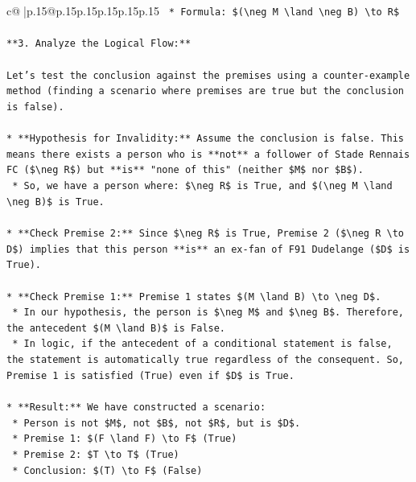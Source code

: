 \documentclass{article}
\begin{document}
{\begin{supertabular}{c@{$\;$}|p{.15\linewidth}@{}p{.15\linewidth}p{.15\linewidth}p{.15\linewidth}p{.15\linewidth}p{.15\linewidth}}
{{{\texttt{    *   Formula: \$(\textbackslash{}neg M \textbackslash{}land \textbackslash{}neg B) \textbackslash{}to R\$} \\
\\ 
\texttt{**3. Analyze the Logical Flow:**} \\
\\ 
\texttt{Let's test the conclusion against the premises using a counter{-}example method (finding a scenario where premises are true but the conclusion is false).} \\
\\ 
\texttt{*   **Hypothesis for Invalidity:** Assume the conclusion is false. This means there exists a person who is **not** a follower of Stade Rennais FC (\$\textbackslash{}neg R\$) but **is** "none of this" (neither \$M\$ nor \$B\$).} \\
\texttt{    *   So, we have a person where: \$\textbackslash{}neg R\$ is True, and \$(\textbackslash{}neg M \textbackslash{}land \textbackslash{}neg B)\$ is True.} \\
\\ 
\texttt{*   **Check Premise 2:** Since \$\textbackslash{}neg R\$ is True, Premise 2 (\$\textbackslash{}neg R \textbackslash{}to D\$) implies that this person **is** an ex{-}fan of F91 Dudelange (\$D\$ is True).} \\
\\ 
\texttt{*   **Check Premise 1:** Premise 1 states \$(M \textbackslash{}land B) \textbackslash{}to \textbackslash{}neg D\$.} \\
\texttt{    *   In our hypothesis, the person is \$\textbackslash{}neg M\$ and \$\textbackslash{}neg B\$. Therefore, the antecedent \$(M \textbackslash{}land B)\$ is False.} \\
\texttt{    *   In logic, if the antecedent of a conditional statement is false, the statement is automatically true regardless of the consequent. So, Premise 1 is satisfied (True) even if \$D\$ is True.} \\
\\ 
\texttt{*   **Result:** We have constructed a scenario:} \\
\texttt{    *   Person is not \$M\$, not \$B\$, not \$R\$, but is \$D\$.} \\
\texttt{    *   Premise 1: \$(F \textbackslash{}land F) \textbackslash{}to F\$ (True)} \\
\texttt{    *   Premise 2: \$T \textbackslash{}to T\$ (True)} \\
\texttt{    *   Conclusion: \$(T) \textbackslash{}to F\$ (False)} \\
}}}
\end{supertabular}}
\end{document}
